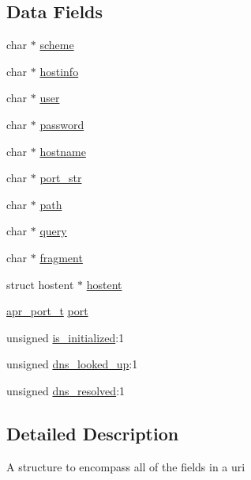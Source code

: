 \subsection*{Data Fields}
\begin{DoxyCompactItemize}
\item 
char $\ast$ \hyperlink{structapr__uri__t_a5d62fa370265b6bc956aa86d36024a5d}{scheme}
\item 
char $\ast$ \hyperlink{structapr__uri__t_a985b18875320d40cdb33d722ecf20ac2}{hostinfo}
\item 
char $\ast$ \hyperlink{structapr__uri__t_a2b763f50bec4fda0cf67e5238275b5fd}{user}
\item 
char $\ast$ \hyperlink{structapr__uri__t_a7eabf4f785f98a12762076f7519d3959}{password}
\item 
char $\ast$ \hyperlink{structapr__uri__t_a8c6bf3dfca3d159f091377d9f7228aec}{hostname}
\item 
char $\ast$ \hyperlink{structapr__uri__t_ad9d69051e1fb3f3709260c3c3c014012}{port\+\_\+str}
\item 
char $\ast$ \hyperlink{structapr__uri__t_a61cff1baadb3c1b52a34b502c25bba7f}{path}
\item 
char $\ast$ \hyperlink{structapr__uri__t_a88d889bcda9e95696022f04ffb470678}{query}
\item 
char $\ast$ \hyperlink{structapr__uri__t_a0e4abeaa1379c79dcc6fdac01d76715a}{fragment}
\item 
struct hostent $\ast$ \hyperlink{structapr__uri__t_a2ec4edaa7288f3c1ebcb8cbca3d0379c}{hostent}
\item 
\hyperlink{group__apr__network__io_gaa670a71960f6eb4fe0d0de2a1e7aba03}{apr\+\_\+port\+\_\+t} \hyperlink{structapr__uri__t_a6e6e858ce56b5d58389287c1cc1134fa}{port}
\item 
unsigned \hyperlink{structapr__uri__t_a6f77dda6db6c31c2c3652f6026ea6b73}{is\+\_\+initialized}\+:1
\item 
unsigned \hyperlink{structapr__uri__t_ae28c03382cb6fcb226dfc76193699342}{dns\+\_\+looked\+\_\+up}\+:1
\item 
unsigned \hyperlink{structapr__uri__t_a805976fea6ef65f3ec1185c7d6dcf7f3}{dns\+\_\+resolved}\+:1
\end{DoxyCompactItemize}


\subsection{Detailed Description}
A structure to encompass all of the fields in a uri 


